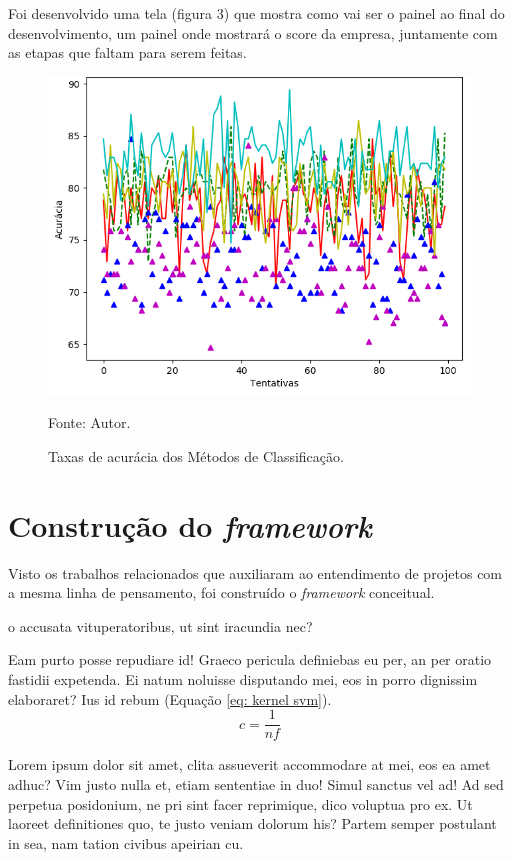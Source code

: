 \documentclass[
	12pt,				%
	openright,			%
	oneside,			%
	a4paper,			%
	english,			%
	french,				%
	spanish,			%
	brazil,				%
	]{abntex2}
\begin{document}
Foi desenvolvido uma tela (figura 3) que mostra como vai ser o painel ao final do desenvolvimento, um painel onde mostrará o score da empresa, juntamente com as etapas que faltam para serem feitas.

\begin{figure}[ht]
    \centering
    \caption{Taxas de acurácia dos Métodos de Classificação.}
    \includegraphics[width=5.0in]{Images/acc-classification.png}
    \label{fig: grafico-acc}
    
    \centering \small Fonte: Autor.
\end{figure}

\section{Construção do \textit{framework} }


Visto os trabalhos relacionados que auxiliaram ao entendimento de projetos com a mesma linha de pensamento, foi construído o \textit{framework}  conceitual. 

o accusata vituperatoribus, ut sint iracundia nec?

Eam purto posse repudiare id! Graeco pericula definiebas eu per, an per oratio fastidii expetenda. Ei natum noluisse disputando mei, eos in porro dignissim elaboraret? Ius id rebum (Equação \ref{eq: kernel svm}).
\begin{equation}
\label{eq: kernel svm}
    c = \frac {1} {\textit{nf}}
\end{equation}

Lorem ipsum dolor sit amet, clita assueverit accommodare at mei, eos ea amet adhuc? Vim justo nulla et, etiam sententiae in duo! Simul sanctus vel ad! Ad sed perpetua posidonium, ne pri sint facer reprimique, dico voluptua pro ex. Ut laoreet definitiones quo, te justo veniam dolorum his? Partem semper postulant in sea, nam tation civibus apeirian cu.
\end{document}
